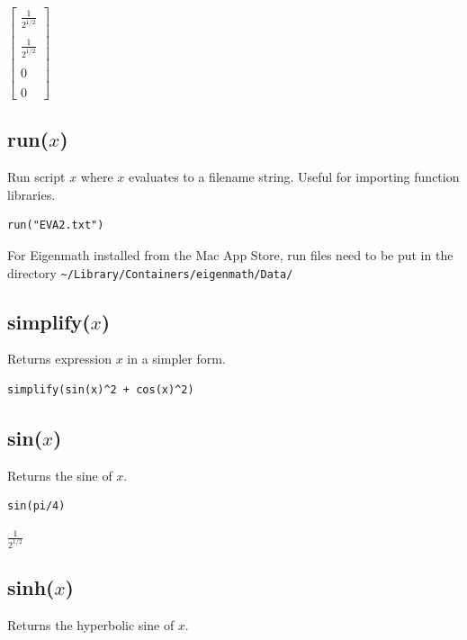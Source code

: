 \documentclass[12pt]{article}
\begin{document}
\noindent
$\displaystyle
\begin{bmatrix}
{\displaystyle \frac{1}{2^{1/2}}}
\\
\\
{\displaystyle \frac{1}{2^{1/2}}}
\\
\\
0
\\
\\
0
\end{bmatrix}
$

\subsection*{run($x$)}

Run script $x$ where $x$ evaluates to a filename string.
Useful for importing function libraries.

{\color{blue}
\begin{verbatim}
run("EVA2.txt")
\end{verbatim}
}

\noindent
For Eigenmath installed from the Mac App Store,
run files need to be put in the directory
\verb$~/Library/Containers/eigenmath/Data/$

\subsection*{simplify($x$)}

Returns expression $x$ in a simpler form.

{\color{blue}
\begin{verbatim}
simplify(sin(x)^2 + cos(x)^2)
\end{verbatim}
}


\subsection*{sin($x$)}

Returns the sine of $x$.

{\color{blue}
\begin{verbatim}
sin(pi/4)
\end{verbatim}
}

\noindent
$\displaystyle \frac{1}{2^{1/2}}$

\subsection*{sinh($x$)}

Returns the hyperbolic sine of $x$.
\end{document}
